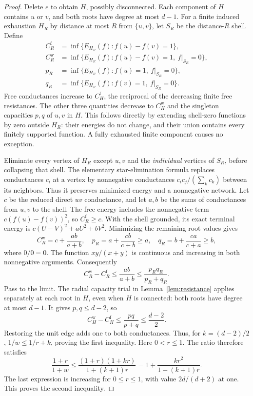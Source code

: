 \documentclass[11pt]{article}
\begin{document}
\begin{proof}
Delete $e$ to obtain $H$, possibly disconnected. Each component of $H$
contains $u$ or $v$, and both roots have degree at most $d-1$.
For a finite induced exhaustion $H_R$ by distance at most $R$ from
$\{u,v\}$, let $S_R$ be the distance-$R$ shell. Define
\begin{align*}
 C_R^{\mathrm f}&=\inf\{E_{H_R}(f):f(u)-f(v)=1\},\\
 C_R^{\mathrm w}&=\inf\{E_{H_R}(f):f(u)-f(v)=1,\ f|_{S_R}=0\},\\
 p_R&=\inf\{E_{H_R}(f):f(u)=1,\ f|_{S_R}=0\},\\
 q_R&=\inf\{E_{H_R}(f):f(v)=1,\ f|_{S_R}=0\}.
\end{align*}
Free conductances increase to $C_H^{\mathrm f}$, the reciprocal of
the decreasing finite free resistances. The other three quantities
decrease to $C_H^{\mathrm w}$ and the singleton capacities $p,q$ of
$u,v$ in $H$. This follows directly by extending shell-zero functions
by zero outside $H_R$: their energies do not change, and their union
contains every finitely supported function. A fully exhausted finite
component causes no exception.

Eliminate every vertex of $H_R$ except $u,v$ and the \emph{individual}
vertices of $S_R$, before collapsing that shell. The elementary
star-elimination formula replaces conductances $c_i$ at a vertex by
nonnegative conductances $c_ic_j/(\sum_kc_k)$ between its neighbors.
Thus it preserves minimized energy and a nonnegative network.
Let $c$ be the reduced direct $uv$ conductance, and let $a,b$ be the
sums of conductances from $u,v$ to the shell. The free energy includes
the nonnegative term $c(f(u)-f(v))^2$, so $C_R^{\mathrm f}\ge c$.
With the shell grounded, its exact terminal energy is
$c(U-V)^2+aU^2+bV^2$. Minimizing the remaining root values gives
\[
 C_R^{\mathrm w}=c+\frac{ab}{a+b},\quad
 p_R=a+\frac{cb}{c+b}\ge a,\quad
 q_R=b+\frac{ca}{c+a}\ge b,
\]
where $0/0=0$. The function $xy/(x+y)$ is continuous and increasing
in both nonnegative arguments. Consequently
\[
 C_R^{\mathrm w}-C_R^{\mathrm f}
       \le\frac{ab}{a+b}\le\frac{p_Rq_R}{p_R+q_R}.
\]
Pass to the limit. The radial capacity trial in
Lemma~\ref{lem:resistance} applies separately at each root in $H$,
even when $H$ is connected: both roots have degree at most $d-1$.
It gives $p,q\le d-2$, so
\begin{equation}\label{eq:escape-conductance}
 C_H^{\mathrm w}-C_H^{\mathrm f}
             \le\frac{pq}{p+q}\le\frac{d-2}{2}.
\end{equation}
Restoring the unit edge adds one to both conductances. Thus, for
$k=(d-2)/2$, $1/w\le1/r+k$, proving the first inequality.
Here $0<r\le1$. The ratio therefore satisfies
\[
 \frac{1+r}{1+w}\le
 \frac{(1+r)(1+kr)}{1+(k+1)r}
     =1+\frac{kr^2}{1+(k+1)r}.
\]
The last expression is increasing for $0\le r\le1$, with value
$2d/(d+2)$ at one. This proves the second inequality.
\end{proof}
\end{document}
